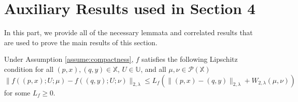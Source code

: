 \documentclass[11pt]{article}
\newcommand{\XX}{\mathbb{X}}
\newcommand{\UU}{\mathbb{U}}
\newcommand{\cP}{\mathcal{P}}
\begin{document}
\section{Auxiliary Results used in Section 4}
In this part, we provide all of the necessary lemmata and correlated results that are used to prove the main results of this section.
\begin{lemma}\label{lemma:f-lipschitz}
    Under Assumption \ref{assume:compactness}, $f$ satisfies the following Lipschitz condition for all $(p,x),(q,y)\in\XX$, $U\in\UU$, and all $\mu,\nu\in\cP(\XX)$
    \begin{equation*}
        \|f((p,x);U;\mu)-f((q,y);U;\nu)\|_{2,\lambda} \leq L_f(\|(p,x)-(q,y)\|_{2,\lambda} + W_{2,\lambda}(\mu,\nu))
    \end{equation*}
    for some $L_f \geq 0$.
\end{lemma}
\end{document}
